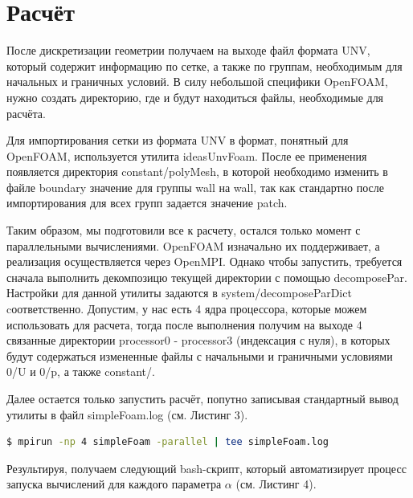 \documentclass[a4paper, 12pt]{article}
\begin{document}
    \section{Расчёт}
    После дискретизации геометрии получаем на выходе файл формата UNV, который содержит информацию по сетке, а также по группам, необходимым для начальных и граничных условий. В силу небольшой специфики OpenFOAM, нужно создать директорию, где и будут находиться файлы, необходимые для расчёта.

    

    Для импортирования сетки из формата UNV в формат, понятный для OpenFOAM, используется утилита ideasUnvFoam. После ее применения появляется директория constant/polyMesh, в которой необходимо изменить в файле boundary значение для группы wall на wall, так как стандартно после импортирования для всех групп задается значение patch.

    Таким образом, мы подготовили все к расчету, остался только момент с параллельными вычислениями. OpenFOAM изначально их поддерживает, а реализация осуществляется через OpenMPI. Однако чтобы запустить, требуется сначала выполнить декомпозицю текущей директории с помощью decomposePar. Настройки для данной утилиты задаются в system/decomposeParDict cоответственно. Допустим, у нас есть 4 ядра процессора, которые можем использовать для расчета, тогда после выполнения получим на выходе 4 связанные директории processor0 - processor3 (индексация с нуля), в которых будут содержаться измененные файлы с начальными и граничными условиями 0/U и 0/p, а также constant/.

    Далее остается только запустить расчёт, попутно записывая стандартный вывод утилиты в файл simpleFoam.log (см. Листинг 3).

    \begin{lstlisting}[language=sh, caption={sh}]
$ mpirun -np 4 simpleFoam -parallel | tee simpleFoam.log
    \end{lstlisting}

    Результируя, получаем следующий bash-скрипт, который автоматизирует процесс запуска вычислений для каждого параметра $\alpha$ (см. Листинг 4).

    
    \newpage
\end{document}
